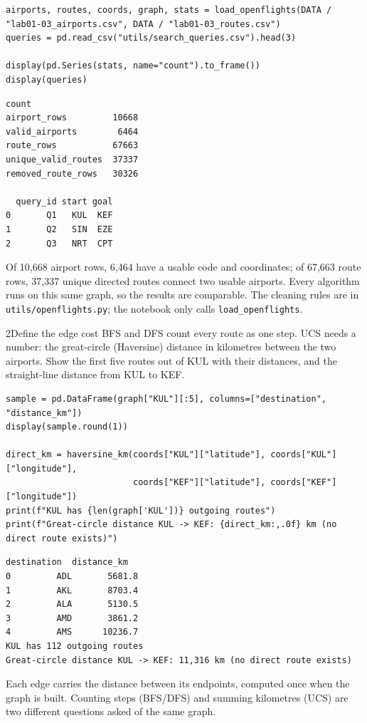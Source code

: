 \begin{labanswer}
\begin{lstlisting}[style=utppython]
airports, routes, coords, graph, stats = load_openflights(DATA / "lab01-03_airports.csv", DATA / "lab01-03_routes.csv")
queries = pd.read_csv("utils/search_queries.csv").head(3)

display(pd.Series(stats, name="count").to_frame())
display(queries)
\end{lstlisting}
\expectedoutput
\begin{lstlisting}[style=utpterminal]
                     count
airport_rows         10668
valid_airports        6464
route_rows           67663
unique_valid_routes  37337
removed_route_rows   30326

  query_id start goal
0       Q1   KUL  KEF
1       Q2   SIN  EZE
2       Q3   NRT  CPT
\end{lstlisting}
Of 10,668 airport rows, 6,464 have a usable code and coordinates; of 67,663 route rows, 37,337 unique directed routes connect two usable airports. Every algorithm runs on this same graph, so the results are comparable. The cleaning rules are in \texttt{utils/openflights.py}; the notebook only calls \texttt{load\_openflights}.
\end{labanswer}

\begin{labquestion}{2}{Define the edge cost}
BFS and DFS count every route as one step. UCS needs a number: the great-circle (Haversine) distance in kilometres between the two airports. Show the first five routes out of KUL with their distances, and the straight-line distance from KUL to KEF.
\end{labquestion}

\begin{labanswer}
\begin{lstlisting}[style=utppython]
sample = pd.DataFrame(graph["KUL"][:5], columns=["destination", "distance_km"])
display(sample.round(1))

direct_km = haversine_km(coords["KUL"]["latitude"], coords["KUL"]["longitude"],
                         coords["KEF"]["latitude"], coords["KEF"]["longitude"])
print(f"KUL has {len(graph['KUL'])} outgoing routes")
print(f"Great-circle distance KUL -> KEF: {direct_km:,.0f} km (no direct route exists)")
\end{lstlisting}
\expectedoutput
\begin{lstlisting}[style=utpterminal]
  destination  distance_km
0         ADL       5681.8
1         AKL       8703.4
2         ALA       5130.5
3         AMD       3861.2
4         AMS      10236.7
KUL has 112 outgoing routes
Great-circle distance KUL -> KEF: 11,316 km (no direct route exists)
\end{lstlisting}
Each edge carries the distance between its endpoints, computed once when the graph is built. Counting steps (BFS/DFS) and summing kilometres (UCS) are two different questions asked of the same graph.
\end{labanswer}

